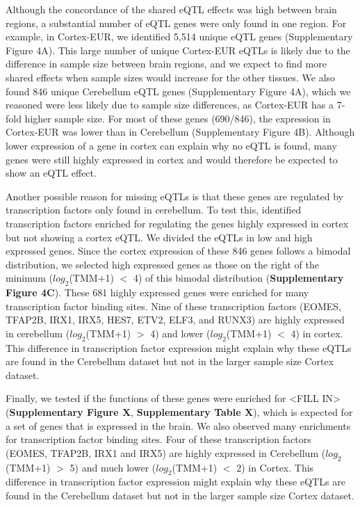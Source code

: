 Although the concordance of the shared eQTL effects was high between brain regions, a substantial number of eQTL genes were only found in one region. For example, in Cortex-EUR, we identified 5,514 unique eQTL genes (Supplementary Figure 4A). This large number of unique Cortex-EUR eQTLs is likely due to the difference in sample size between brain regions, and we expect to find more shared effects when sample sizes would increase for the other tissues. We also found 846 unique Cerebellum eQTL genes (Supplementary Figure 4A), which we reasoned were less likely due to sample size differences, as Cortex-EUR has a 7-fold higher sample size. For most of these genes (690/846), the expression in Cortex-EUR was lower than in Cerebellum (Supplementary Figure 4B). Although lower expression of a gene in cortex can explain why no eQTL is found, many genes were still highly expressed in cortex and would therefore be expected to show an eQTL effect.  

Another possible reason for missing eQTLs is that these genes are regulated by transcription factors only found in cerebellum. To test this, identified transcription factors enriched for regulating the genes highly expressed in cortex but not showing a cortex eQTL. We divided the eQTLs in low and high expressed genes. Since the cortex expression of these 846 genes follows a bimodal distribution, we selected high expressed genes as those on the right of the minimum ($log_2$(TMM+1) $<$ 4) of this bimodal distribution (\textbf{Supplementary Figure 4C}). These 681 highly expressed genes were enriched for many transcription factor binding sites. Nine of these transcription factors (EOMES, TFAP2B, IRX1, IRX5, HES7, ETV2, ELF3, and RUNX3) are highly expressed in cerebellum ($log_2$(TMM+1) $>$ 4) and lower ($log_2$(TMM+1) $<$ 4) in cortex. This difference in transcription factor expression might explain why these eQTLs are found in the Cerebellum dataset but not in the larger sample size Cortex dataset. 

Finally, we tested if the functions of these genes were enriched for <FILL IN> (\textbf{Supplementary Figure X}, \textbf{Supplementary Table X}), which is expected for a set of genes that is expressed in the brain. We also observed many enrichments for transcription factor binding sites. Four of these transcription factors (EOMES, TFAP2B, IRX1 and IRX5) are highly expressed in Cerebellum ($log_2$(TMM+1) $>$ 5) and much lower ($log_2$(TMM+1) $<$ 2) in Cortex. This difference in transcription factor expression might explain why these eQTLs are found in the Cerebellum dataset but not in the larger sample size Cortex dataset. 

